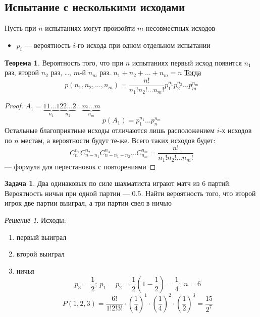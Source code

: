 \documentclass[english]{article}
\theoremstyle{plain}
\theoremstyle{remark}
\newtheorem*{solution}{Решение}
\theoremstyle{definition}
\newtheorem{task}{Задача}
\newtheorem{theorem}{Теорема}[section]
\begin{document}
\subsection{Испытание с несколькими исходами}
\label{sec:orgee81db7}
Пусть при \(n\) испытаниях могут произойти \(m\) несовместных исходов
\begin{itemize}
\item \(p_i\) --- вероятность \(i\)-го исхода при одном отдельном испытании
\end{itemize}
\begin{theorem}
Вероятность того, что при \(n\) испытаниях первый исход появится \(n_1\) раз, второй \(n_2\) раз, \dots{}, \(m\)-й \(n_m\) раз. \(n_1 + n_2 + \dots + n_m = n\)
\uline{Тогда} \[ p(n_1, n_2, \dots, n_m) = \frac{n!}{n_1!n_2!\dots n_m!}p_1^{n_1}p_2^{n_2}\dots p_m^{n_m} \]
\end{theorem}
\begin{proof}
\(A_1 = \underbrace{11\dots1}_{n_1}\underbrace{22\dots2}_{n_2}\dots \underbrace{m\dots m}_{n_m}\)
\[ p(A_1) = p_1^{n_1}\dots p_n^{n_m} \]
Остальные благоприятные исходы отличаются лишь расположением \(i\)-х исходов по \(n\) местам, а вероятности будут те-же. Всего таких исходов будет:
\[ C^{n_1}_nC^{n_2}_{n - n_1}C^{n_3}_{n - n_1 - n_2}\dots C^{n_m}_{n_m} = \frac{n!}{n_1!n_2!\dots n_m!} \] --- формула для перестановок с повторениями
\end{proof}
\begin{task}
Два одинаковых по силе шахматиста играют матч из 6 партий. Вероятность ничьи при одной партии --- \(0.5\). Найти вероятность того, что второй игрок две партии выиграл, а три партии свел в ничью
\end{task}
\begin{solution}
Исходы:
\begin{enumerate}
\item первый выиграл
\item второй выиграл
\item ничья
\[ p_3 = \frac{1}{2};\ p_1 = p_2 = \frac{1}{2}\left(1 - \frac{1}{2}\right) = \frac{1}{4};\ n= 6 \]
\[ P(1, 2, 3) = \frac{6!}{1!2!3!}\cdot\left(\frac{1}{4}\right)^1\cdot\left(\frac{1}{4}\right)^2\cdot\left(\frac{1}{2}\right)^3  = \frac{15}{2^7}\]
\end{enumerate}
\end{solution}
\end{document}
